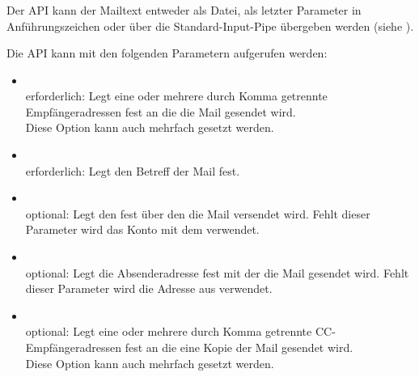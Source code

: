 \subsubsection{}
    Der API  kann der Mailtext entweder 
    als Datei, als letzter Parameter in Anführungszeichen oder über die 
    Standard-Input-Pipe übergeben werden
    (siehe ).

    Die API kann mit den folgenden Parametern aufgerufen werden:
    
\begin {itemize}
  \item [\var{-t},]  
    \\erforderlich: Legt eine oder mehrere durch Komma getrennte
    Empfängeradressen fest an die die Mail gesendet wird.
    \\ Diese Option kann auch mehrfach gesetzt werden.

  \item [\var{-s},]  
    \\erforderlich: Legt den Betreff der Mail fest.
  
  \item [\var{-A},]  
    \\optional: Legt den 
    fest über den die Mail versendet wird. Fehlt dieser Parameter wird das
    Konto mit dem   verwendet.
  
  \item [\var{-f},]  
    \\optional: Legt die Absenderadresse fest mit der die Mail gesendet wird. 
    Fehlt dieser Parameter wird die Adresse aus 
     verwendet.
  
  \item [\var{-c},]  
    \\optional: Legt eine oder mehrere durch Komma getrennte
    CC-Empfängeradressen fest an die eine Kopie der Mail gesendet wird.
    \\ Diese Option kann auch mehrfach gesetzt werden.


\end{itemize}
